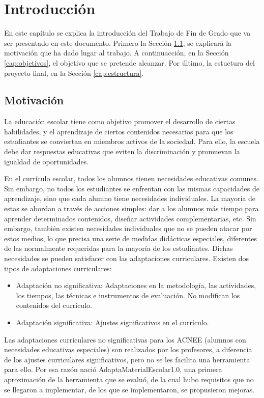 \chapter{Introducción}
\label{ch:introduccion}

En este capítulo se explica la introducción del Trabajo de Fin de Grado que va ser presentado en este documento. Primero la Sección \ref{cap:motivacio}, se explicará la motivación que ha dado lugar al trabajo. A continuacción, en la Sección \ref{cap:objetivos}, el objetivo que se pretende alcanzar. Por último, la estuctura del proyecto final, en la Sección \ref{cap:estructura}.

\section{Motivación}\label{cap:motivacio}
La educación escolar tiene como objetivo promover el desarrollo de ciertas habilidades, y el aprendizaje de ciertos contenidos necesarios para que los estudiantes se conviertan en miembros activos de la sociedad. Para ello, la escuela debe dar respuestas educativas que eviten la discriminación y promuevan la igualdad de oportunidades.

En el currículo escolar, todos los alumnos tienen necesidades educativas comunes. Sin embargo, no todos los estudiantes se enfrentan con las mismas capacidades de aprendizaje, sino que cada alumno tiene necesidades individuales. La mayoría de estas se abordan a través de acciones simples: dar a los alumnos más tiempo para aprender determinados contenidos, diseñar actividades complementarias, etc.  Sin embargo, también existen necesidades individuales que no se pueden atacar por estos medios, lo que precisa una serie de medidas didácticas especiales, diferentes de las normalmente requeridas para la mayoría de los estudiantes. Dichas necesidades se pueden satisfacer con las adaptaciones curriculares. Existen dos tipos de adaptaciones curriculares:
\begin{itemize}
    \item Adaptación no significativa: Adaptaciones en la metodología, las actividades, los tiempos,
    las técnicas e instrumentos de evaluación. No modifican los contenidos del currículo.  
    \item Adaptación significativa: Ajustes significativos en el currículo. 
\end{itemize}
Las adaptaciones curriculares no significativas para los ACNEE (alumnos con necesidades educativas especiales) son realizados por los profesores, a diferencia de los ajustes curriculares significativos, pero no se les facilita una herramienta para ello. Por esa razón nació AdaptaMaterialEscolar1.0, una primera aproximación de la herramienta que se evaluó, de la cual hubo requisitos que no se llegaron a implementar, de los que se implementaron, se propusieron mejoras.

